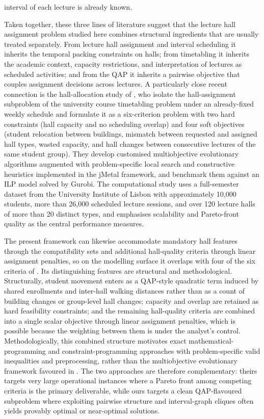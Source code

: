 \documentclass[11pt]{article}
\begin{document}
interval of each lecture is already known.

Taken together, these three lines of literature suggest that the lecture hall assignment problem studied here combines structural ingredients that are usually treated separately. From lecture hall assignment and interval scheduling it inherits the temporal packing constraints on halls; from timetabling it inherits the academic context, capacity restrictions, and interpretation of lectures as scheduled activities; and from the QAP it inherits a pairwise objective that couples assignment decisions across lectures. A particularly close recent connection is the hall-allocation study of \citet{roomalloc2026}, who isolate the hall-assignment subproblem of the university course timetabling problem under an already-fixed weekly schedule and formulate it as a six-criterion problem with two hard constraints (hall capacity and no scheduling overlap) and four soft objectives (student relocation between buildings, mismatch between requested and assigned hall types, wasted capacity, and hall changes between consecutive lectures of the same student group). They develop customised multiobjective evolutionary algorithms augmented with problem-specific local search and constructive heuristics implemented in the jMetal framework, and benchmark them against an ILP model solved by Gurobi. The computational study uses a full-semester dataset from the University Institute of Lisbon with approximately 10{,}000 students, more than 26{,}000 scheduled lecture sessions, and over 120 lecture halls of more than 20 distinct types, and emphasises scalability and Pareto-front quality as the central performance measures.

The present framework can likewise accommodate mandatory hall features through the compatibility sets and additional hall-quality criteria through linear assignment penalties, so on the modelling surface it overlaps with four of the six criteria of \citet{roomalloc2026}. Its distinguishing features are structural and methodological. Structurally, student movement enters as a QAP-style quadratic term induced by shared enrollments and inter-hall walking distances rather than as a count of building changes or group-level hall changes; capacity and overlap are retained as hard feasibility constraints; and the remaining hall-quality criteria are combined into a single scalar objective through linear assignment penalties, which is possible because the weighting between them is under the analyst's control. Methodologically, this combined structure motivates exact mathematical-programming and constraint-programming approaches with problem-specific valid inequalities and preprocessing, rather than the multiobjective evolutionary framework favoured in \citet{roomalloc2026}. The two approaches are therefore complementary: theirs targets very large operational instances where a Pareto front among competing criteria is the primary deliverable, while ours targets a clean QAP-flavoured subproblem where exploiting pairwise structure and interval-graph cliques often yields provably optimal or near-optimal solutions.
\end{document}
